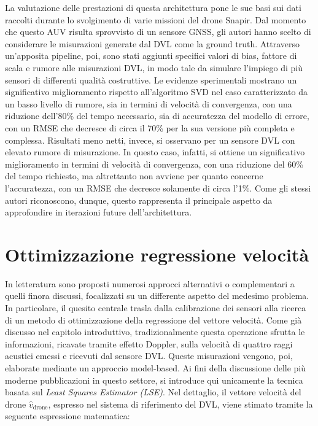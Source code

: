 La valutazione delle prestazioni di questa architettura pone le sue basi sui dati raccolti durante lo svolgimento di varie missioni del drone Snapir. Dal momento che questo AUV risulta sprovvisto di un sensore GNSS, gli autori hanno scelto di considerare le misurazioni generate dal DVL come la ground truth. Attraverso un'apposita pipeline, poi, sono stati aggiunti specifici valori di bias, fattore di scala e rumore alle misurazioni DVL, in modo tale da simulare l'impiego di più sensori di differenti qualità costruttive. Le evidenze sperimentali mostrano un significativo miglioramento rispetto all'algoritmo SVD nel caso caratterizzato da un basso livello di rumore, sia in termini di velocità di convergenza, con una riduzione dell'80\% del tempo necessario, sia di accuratezza del modello di errore, con un RMSE che decresce di circa il 70\% per la sua versione più completa e complessa. Risultati meno netti, invece, si osservano per un sensore DVL con elevato rumore di misurazione. In questo caso, infatti, si ottiene un significativo miglioramento in termini di velocità di convergenza, con una riduzione del 60\% del tempo richiesto, ma altrettanto non avviene per quanto concerne l'accuratezza, con un RMSE che decresce solamente di circa l'1\%. Come gli stessi autori riconoscono, dunque, questo rappresenta il principale aspetto da approfondire in iterazioni future dell'architettura.

\section{Ottimizzazione regressione velocità}

In letteratura sono proposti numerosi approcci alternativi o complementari a quelli finora discussi, focalizzati su un differente aspetto del medesimo problema. In particolare, il quesito centrale trasla dalla calibrazione dei sensori alla ricerca di un metodo di ottimizzazione della regressione del vettore velocità. Come già discusso nel capitolo introduttivo, tradizionalmente questa operazione sfrutta le informazioni, ricavate tramite effetto Doppler, sulla velocità di quattro raggi acustici emessi e ricevuti dal sensore DVL. Queste misurazioni vengono, poi, elaborate mediante un approccio model-based. Ai fini della discussione delle più moderne pubblicazioni in questo settore, si introduce qui unicamente la tecnica basata sul \emph{Least Squares Estimator (LSE)}. Nel dettaglio, il vettore velocità del drone $\hat{v}_{\text{drone}}$, espresso nel sistema di riferimento del DVL, viene stimato tramite la seguente espressione matematica: 

